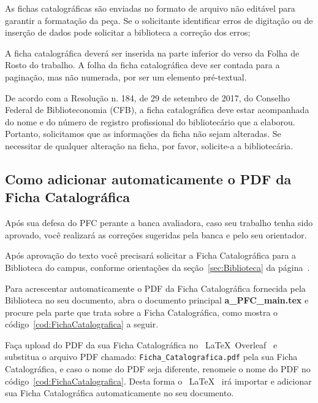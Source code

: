 As fichas catalográficas são enviadas no formato de arquivo não editável para garantir a formatação da peça. Se o solicitante identificar erros de digitação ou de inserção de
dados pode solicitar a biblioteca a correção dos erros;

A ficha catalográfica deverá ser inserida na parte inferior do verso da Folha de Rosto do trabalho. A folha da ficha catalográfica deve ser contada para a paginação, mas não numerada, por ser um elemento pré-textual.

De acordo com a Resolução n. 184, de 29 de setembro de 2017, do Conselho
Federal de Biblioteconomia (CFB), a ficha catalográfica deve estar acompanhada do
nome e do número de registro profissional do bibliotecário que a elaborou. Portanto,
solicitamos que as informações da ficha não sejam alteradas. Se necessitar de qualquer alteração na ficha, por favor, solicite-a a bibliotecária.


\subsection{Como adicionar automaticamente o PDF da Ficha Catalográfica}

Após sua defesa do PFC perante a banca avaliadora, caso seu trabalho tenha sido aprovado, você realizará as correções sugeridas pela banca e pelo seu orientador.

Após aprovação do texto você precisará solicitar a Ficha Catalográfica para a Biblioteca do campus, conforme orientações da seção~\ref{sec:Biblioteca} da página~\pageref{sec:Biblioteca}.

Para acrescentar automaticamente o PDF da Ficha Catalográfica fornecida pela Biblioteca no seu documento, abra o documento principal {\bf a\_PFC\_main.tex} e procure pela parte que trata sobre a Ficha Catalográfica, como mostra o código~\ref{cod:FichaCatalografica} a seguir.

Faça upload do PDF da sua Ficha Catalográfica no ~\LaTeX~Overleaf~ e substitua o arquivo PDF chamado: \verb|Ficha_Catalografica.pdf| pela sua Ficha Catalográfica, e caso o nome do PDF seja diferente, renomeie o nome do PDF no código~\ref{cod:FichaCatalografica}. Desta forma o ~\LaTeX~ irá importar e adicionar sua Ficha Catalográfica automaticamente no seu documento.

\pagebreak

\begin{Codigo}[language=tex, caption=Código da Ficha Catalográfica no documento principal {\bf a\_PFC\_main.tex}, label=cod:FichaCatalografica]
\end{Codigo}

